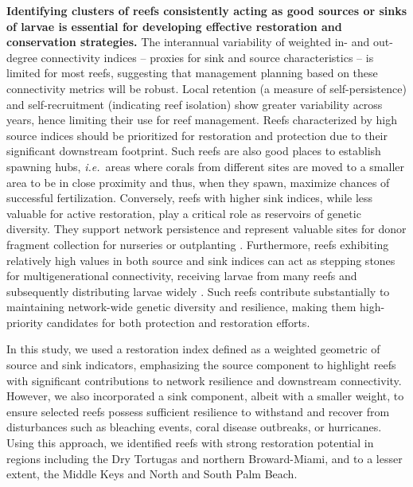 \documentclass[preprint,12pt,authoryear]{elsarticle}
\newcommand{\ie}{{\it i.e.}\ }
\begin{document}
	\textbf{Identifying clusters of reefs consistently acting as good sources or sinks of larvae is essential for developing effective restoration and conservation strategies.} The interannual variability of weighted in- and out-degree connectivity indices -- proxies for sink and source characteristics -- is limited for most reefs, suggesting that management planning based on these connectivity metrics will be robust. Local retention (a measure of self-persistence) and self-recruitment (indicating reef isolation) show greater variability across years, hence limiting their use for reef management. Reefs characterized by high source indices should be prioritized for restoration and protection due to their significant downstream footprint. Such reefs are also good places to establish spawning hubs, \ie areas where corals from different sites are moved to a smaller area to be in close proximity and thus, when they spawn, maximize chances of successful fertilization. Conversely, reefs with higher sink indices, while less valuable for active restoration, play a critical role as reservoirs of genetic diversity. They support network persistence and represent valuable sites for donor fragment collection for nurseries or outplanting \citep{king2023larval}. Furthermore, reefs exhibiting relatively high values in both source and sink indices can act as stepping stones for multigenerational connectivity, receiving larvae from many reefs and subsequently distributing larvae widely \citep{frys2020fine}. Such reefs contribute substantially to maintaining network-wide genetic diversity and resilience, making them high-priority candidates for both protection and restoration efforts.
	
	In this study, we used a restoration index defined as a weighted geometric of source and sink indicators, emphasizing the source component to highlight reefs with significant contributions to network resilience and downstream connectivity. However, we also incorporated a sink component, albeit with a smaller weight, to ensure selected reefs possess sufficient resilience to withstand and recover from disturbances such as bleaching events, coral disease outbreaks, or hurricanes. Using this approach, we identified reefs with strong restoration potential in regions including the Dry Tortugas and northern Broward-Miami, and to a lesser extent, the Middle Keys and North and South Palm Beach.
	
\end{document}

